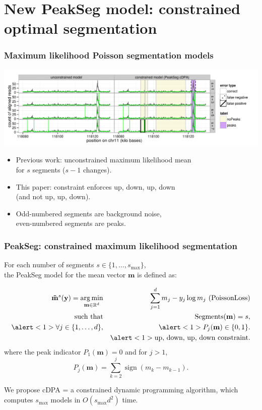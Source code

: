 \documentclass{beamer}
\DeclareMathOperator*{\argmin}{arg\,min}
\DeclareMathOperator*{\Lik}{Lik}
\DeclareMathOperator*{\Segments}{Segments}
\newcommand{\sign}{\operatorname{sign}}
\newcommand{\RR}{\mathbb R}
\begin{document}
\section{New PeakSeg model: constrained optimal segmentation}

\begin{frame}
  \frametitle{Maximum likelihood Poisson segmentation models}
  \includegraphics[width=1.1\textwidth]{figure-Segmentor-PeakSeg}

  \begin{itemize}
  \item Previous work: unconstrained maximum likelihood mean\\
    for $s$ segments ($s-1$ changes).
  \item This paper: constraint enforces up, down, up, down\\ (and not
    up, up, down).
  \item Odd-numbered segments are background noise,\\
    even-numbered segments are peaks.
  \end{itemize}
\end{frame}

\begin{frame}[fragile]
  \frametitle{PeakSeg:  constrained maximum likelihood
    segmentation}
For each number of segments $s\in\{1, \dots,
  s_{\text{max}}\}$,\\
the PeakSeg model for the mean vector $\mathbf m$ is defined as:

  \begin{eqnarray*}
  \label{PeakSeg}
  \mathbf{\tilde m}^s(\mathbf y)  =
    \argmin_{\mathbf m\in\RR^{d}}& &\ \ 
\sum_{j=1}^d
      m_j - y_j \log m_j\text{ (PoissonLoss)}
\\
    \text{such that}& &\ \  \Segments(\mathbf m)=s,  \\
    \alert<1>{\forall j\in\{1, \dots, d\},} & &
    \ \ \alert<1>{P_j(\mathbf m) \in\{0, 1\}.}\\
    && \alert<1>{\text{up, down, up, down constraint.}}
   \end{eqnarray*}
where the peak indicator $P_1(\mathbf m)=0$ and for $j>1$,
\begin{equation*}
  \label{eq:peaks}
  P_j(\mathbf m) = \sum_{k=2}^j \sign( m_{k} - m_{k-1} ).
\end{equation*}

We propose cDPA = a constrained dynamic programming algorithm, which
computes $s_{\text{max}}$ models in $O(s_{\text{max}} d^2)$ time.

\end{frame}
\end{document}
